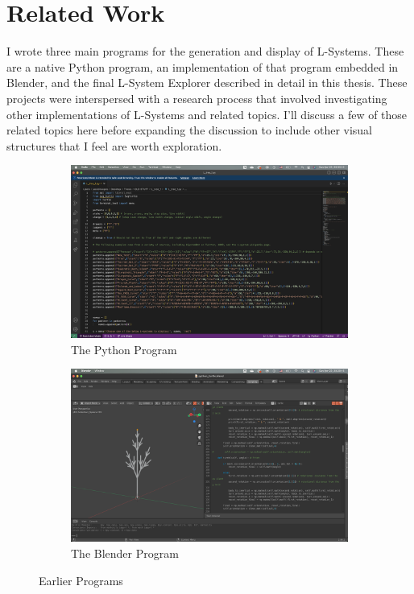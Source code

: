 \documentclass[12pt,twoside]{reedthesis}
\begin{document}
\section{Related Work}
	I wrote three main programs for the generation and display of L-Systems. These are a native Python program, an implementation of that program embedded in Blender, and the final L-System Explorer described in detail in this thesis. These projects were interspersed with a research process that involved investigating other implementations of L-Systems and related topics. I'll discuss a few of those related topics here before expanding the discussion to include other visual structures that I feel are worth exploration.\\
	
	
	\begin{figure}[h]
	\centering
	\begin{subfigure}{0.475\linewidth}
		\centering
		\includegraphics[width=\linewidth]{Images/PythonImage}
		\caption{The Python Program}
		\label {PythonProgram}
	\end{subfigure}%
	\hfill
	\begin{subfigure}{0.475\linewidth}
		\centering
		\includegraphics[width=\linewidth]{Images/BlenderImage}
		\caption{The Blender Program}
		\label {BlenderProgram}
	\end{subfigure}
	\caption{Earlier Programs}
	\label{EarlierPrograms}
	\end{figure}
\end{document}
